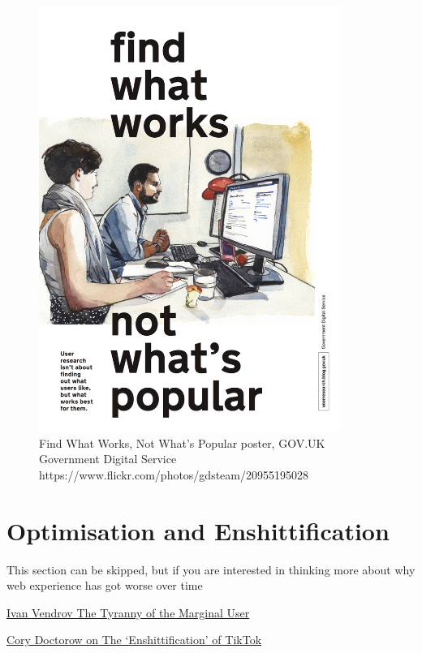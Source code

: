 \documentclass[
  letterpaper,
  DIV=11,
  numbers=noendperiod]{scrreprt}
\begin{document}
\begin{figure}

{\centering \includegraphics[width=3.86in,height=\textheight]{./img/small-gov.png}

}

\caption{\label{fig-find-what-works}Find What Works, Not What's Popular
poster, GOV.UK Government Digital Service
https://www.flickr.com/photos/gdsteam/20955195028}

\end{figure}

\hypertarget{optimisation-and-enshittification}{%
\section{Optimisation and
Enshittification}\label{optimisation-and-enshittification}}

This section can be skipped, but if you are interested in thinking more
about why web experience has got worse over time

\href{https://nothinghuman.substack.com/p/the-tyranny-of-the-marginal-user}{Ivan
Vendrov The Tyranny of the Marginal User}

\href{https://www.wired.com/story/tiktok-platforms-cory-doctorow/}{Cory
Doctorow on The `Enshittification' of TikTok}
\end{document}
